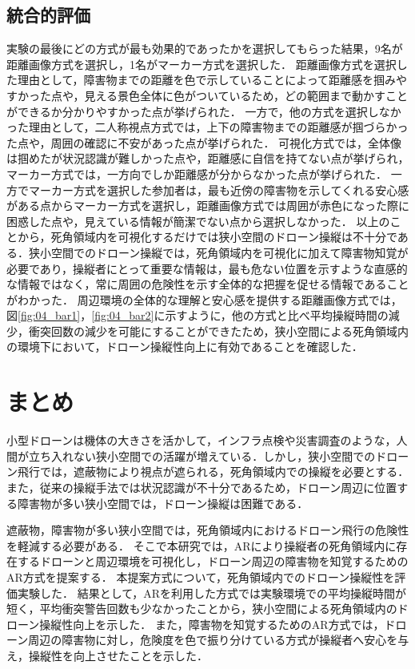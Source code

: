 \documentclass[submit]{ipsj}
\begin{document}
\subsection{統合的評価}
実験の最後にどの方式が最も効果的であったかを選択してもらった結果，9名が距離画像方式を選択し，1名がマーカー方式を選択した．
距離画像方式を選択した理由として，障害物までの距離を色で示していることによって距離感を掴みやすかった点や，見える景色全体に色がついているため，どの範囲まで動かすことができるか分かりやすかった点が挙げられた．
一方で，他の方式を選択しなかった理由として，二人称視点方式では，上下の障害物までの距離感が掴づらかった点や，周囲の確認に不安があった点が挙げられた．
可視化方式では，全体像は掴めたが状況認識が難しかった点や，距離感に自信を持てない点が挙げられ，マーカー方式では，一方向でしか距離感が分からなかった点が挙げられた．
一方でマーカー方式を選択した参加者は，最も近傍の障害物を示してくれる安心感がある点からマーカー方式を選択し，距離画像方式では周囲が赤色になった際に困惑した点や，見えている情報が簡潔でない点から選択しなかった．
以上のことから，死角領域内を可視化するだけでは狭小空間のドローン操縦は不十分である．狭小空間でのドローン操縦では，死角領域内を可視化に加えて障害物知覚が必要であり，操縦者にとって重要な情報は，最も危ない位置を示すような直感的な情報ではなく，常に周囲の危険性を示す全体的な把握を促せる情報であることがわかった．
周辺環境の全体的な理解と安心感を提供する距離画像方式では，図\ref{fig:04_bar1}，\ref{fig:04_bar2}に示すように，他の方式と比べ平均操縦時間の減少，衝突回数の減少を可能にすることができたため，狭小空間による死角領域内の環境下において，ドローン操縦性向上に有効であることを確認した．

\section{まとめ}
\label{sec:Conclusion}
小型ドローンは機体の大きさを活かして，インフラ点検や災害調査のような，人間が立ち入れない狭小空間での活躍が増えている．しかし，狭小空間でのドローン飛行では，遮蔽物により視点が遮られる，死角領域内での操縦を必要とする．また，従来の操縦手法では状況認識が不十分であるため，ドローン周辺に位置する障害物が多い狭小空間では，ドローン操縦は困難である．\par
遮蔽物，障害物が多い狭小空間では，死角領域内におけるドローン飛行の危険性を軽減する必要がある．
そこで本研究では，ARにより操縦者の死角領域内に存在するドローンと周辺環境を可視化し，ドローン周辺の障害物を知覚するためのAR方式を提案する．
本提案方式について，死角領域内でのドローン操縦性を評価実験した．
結果として，ARを利用した方式では実験環境での平均操縦時間が短く，平均衝突警告回数も少なかったことから，狭小空間による死角領域内のドローン操縦性向上を示した．
また，障害物を知覚するためのAR方式では，ドローン周辺の障害物に対し，危険度を色で振り分けている方式が操縦者へ安心を与え，操縦性を向上させたことを示した．
\end{document}
